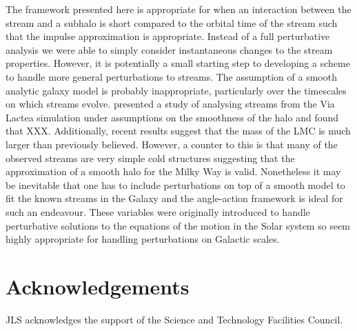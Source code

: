 \documentclass[useAMS,usenatbib,fleqn,a4paper]{mn2e}
\def\kpc{\,{\rm kpc}}
\def\kms{\,{\rm km\,s^{-1}}}
\def\rad{\,\rm rad}
\begin{document}
The framework presented here is appropriate for when an interaction between the stream and a subhalo is short compared to the orbital time of the stream such that the impulse approximation is appropriate. Instead of a full perturbative analysis we were able to simply consider instantaneous changes to the stream properties. However, it is potentially a small starting step to developing a scheme to handle more general perturbations to streams. The assumption of a smooth analytic galaxy model is probably inappropriate, particularly over the timescales on which streams evolve. \cite{Bonaca2014} presented a study of analysing streams from the Via Lactea simulation under assumptions on the smoothness of the halo and found that XXX. Additionally, recent results suggest that the mass of the LMC is much larger than previously believed. However, a counter to this is that many of the observed streams are very simple cold structures suggesting that the approximation of a smooth halo for the Milky Way is valid. Nonetheless it may be inevitable that one has to include perturbations on top of a smooth model to fit the known streams in the Galaxy and the angle-action framework is ideal for such an endeavour. These variables were originally introduced to handle perturbative solutions to the equations of the motion in the Solar system so seem highly appropriate for handling perturbations on Galactic scales.

\section*{Acknowledgements}
JLS acknowledges the support of the Science and Technology Facilities
Council.




\end{document}
